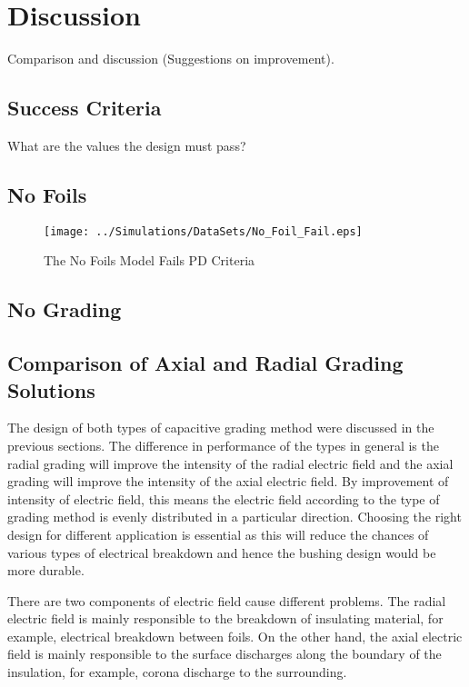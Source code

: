 
\section{Discussion} \label{s:Discussion}
Comparison and discussion (Suggestions on improvement).
\subsection{Success Criteria}
What are the values the design must pass?

\subsection{No Foils}
\begin{figure}[!h]
  \centering
    \texttt{[image: ../Simulations/DataSets/No\_Foil\_Fail.eps]} 
\caption{The No Foils Model Fails PD Criteria}
\label{Figure:NoFoilsFail}
\end{figure}

\subsection{No Grading}

\subsection{Comparison of Axial and Radial Grading Solutions}
The design of both types of capacitive grading method were discussed in the previous sections. The difference in performance of the types in general is the radial grading will improve the intensity of the radial electric field and the axial grading will improve the intensity of the axial electric field. By improvement of intensity of electric field, this means the electric field according to the type of grading method is evenly distributed in a particular direction. Choosing the right design for different application is essential as this will reduce the chances of various types of electrical breakdown and hence the bushing design would be more durable.

There are two components of electric field cause different problems. The radial electric field is mainly responsible to the breakdown of insulating material, for example, electrical breakdown between foils. On the other hand, the axial electric field is mainly responsible to the surface discharges along the boundary of the insulation, for example, corona discharge to the surrounding.

